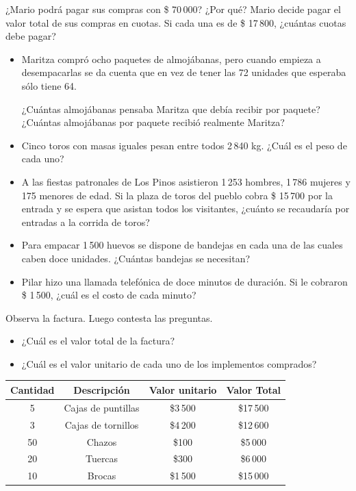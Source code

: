 \documentclass[letterpaper,11pt,twoside]{article}
\begin{document}
\begin{multicols}{2}
¿Mario podrá pagar sus compras con \$ 70\,000? ¿Por qué?
Mario decide pagar el valor total de sus compras en cuotas.
Si cada una es de \$ 17\,800, ¿cuántas cuotas debe pagar?
\begin{itemize}
\item Maritza compró ocho paquetes de almojábanas, pero
cuando empieza a desempacarlas se da cuenta que en vez
de tener las 72 unidades que esperaba sólo tiene 64.

¿Cuántas almojábanas pensaba Maritza que debía recibir
por paquete? ¿Cuántas almojábanas por paquete recibió
realmente Maritza?
\item Cinco toros con masas iguales pesan entre todos 2\,840
kg. ¿Cuál es el peso de cada uno?
\item A las fiestas patronales de Los Pinos asistieron 1\,253 hombres, 1\,786 mujeres y 175 menores de edad. Si la
plaza de toros del pueblo cobra \$ 15\,700 por la entrada
y se espera que asistan todos los visitantes, ¿cuánto se
recaudaría por entradas a la corrida de toros?
\item Para empacar 1\,500 huevos se dispone de bandejas en
cada una de las cuales caben doce unidades. ¿Cuántas
bandejas se necesitan?
\item Pilar hizo una llamada telefónica de doce minutos de
duración. Si le cobraron \$ 1\,500, ¿cuál es el costo de
cada minuto?
 \end{itemize}
\end{multicols}
\begin{minipage}{.35\textwidth}
 Observa la factura. Luego contesta las preguntas.
 \begin{itemize}
 \item ¿Cuál es el valor total de la factura?
\item ¿Cuál es el valor unitario de cada uno de los implementos comprados?
\end{itemize}
\end{minipage}\hfill
\begin{minipage}{.65\textwidth}
\begin{center}
\begin{tabular}{|c|c|c|c|}
\hline 
\textbf{Cantidad} & \textbf{Descripción} & \textbf{Valor unitario} & \textbf{Valor Total} \\ 
\hline 
5 & Cajas de puntillas & \$3\,500 & \$17\,500 \\ 
\hline 
3 & Cajas de tornillos & \$4\,200 & \$12\,600 \\ 
\hline 
50 & Chazos & \$100 & \$5\,000 \\ 
\hline 
20 & Tuercas & \$300 & \$6\,000 \\ 
\hline 
10 & Brocas & \$1\,500 & \$15\,000 \\ 
\hline 
\end{tabular} 
\end{center}
\end{minipage}
\end{document}
